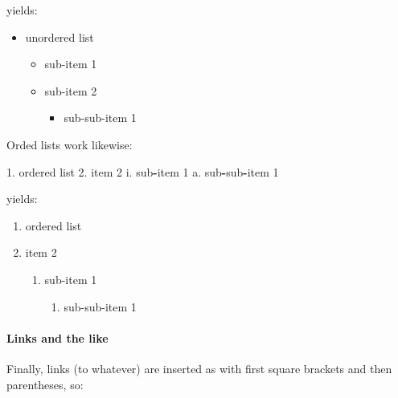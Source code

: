 \documentclass[]{article}
\newenvironment{Shaded}{\begin{snugshade}}{\end{snugshade}}
\newcommand{\DecValTok}[1]{\textcolor[rgb]{0.00,0.00,0.81}{#1}}
\newcommand{\OperatorTok}[1]{\textcolor[rgb]{0.81,0.36,0.00}{\textbf{#1}}}
\newcommand{\NormalTok}[1]{#1}
\providecommand{\tightlist}{%
  \setlength{\itemsep}{0pt}\setlength{\parskip}{0pt}}
\let\oldparagraph\paragraph
\renewcommand{\paragraph}[1]{\oldparagraph{#1}\mbox{}}
\theoremstyle{definition}
\theoremstyle{definition}
\theoremstyle{definition}
\theoremstyle{remark}
\begin{document}
yields:

\begin{itemize}
\tightlist
\item
  unordered list

  \begin{itemize}
  \tightlist
  \item
    sub-item 1
  \item
    sub-item 2

    \begin{itemize}
    \tightlist
    \item
      sub-sub-item 1
    \end{itemize}
  \end{itemize}
\end{itemize}

Orded lists work likewise:

\begin{Shaded}
\begin{Highlighting}[]
\DecValTok{1}\NormalTok{. ordered list}
\DecValTok{2}\NormalTok{. item }\DecValTok{2}
\NormalTok{    i. sub}\OperatorTok{-}\NormalTok{item }\DecValTok{1}
\NormalTok{        a. sub}\OperatorTok{-}\NormalTok{sub}\OperatorTok{-}\NormalTok{item }\DecValTok{1} 
\end{Highlighting}
\end{Shaded}

yields:

\begin{enumerate}
\def\labelenumi{\arabic{enumi}.}
\tightlist
\item
  ordered list
\item
  item 2

  \begin{enumerate}
  \def\labelenumii{\roman{enumii}.}
  \tightlist
  \item
    sub-item 1

    \begin{enumerate}
    \def\labelenumiii{\alph{enumiii}.}
    \tightlist
    \item
      sub-sub-item 1
    \end{enumerate}
  \end{enumerate}
\end{enumerate}

\paragraph{Links and the like}\label{links-and-the-like}

Finally, links (to whatever) are inserted as with first square brackets
and then parentheses, so:
\end{document}
